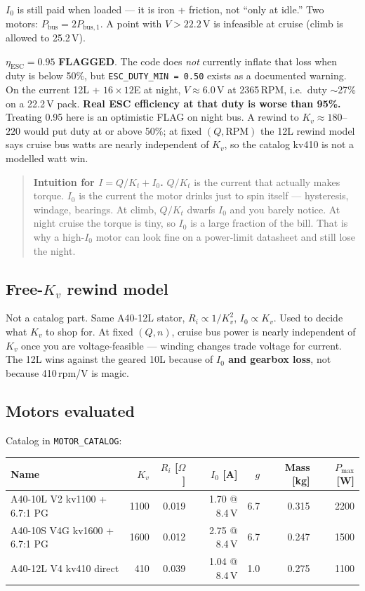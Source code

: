 \documentclass[11pt,letterpaper]{article}
\newcommand{\flag}{\textcolor{red!60!black}{\textbf{FLAGGED}}}
\newcommand{\code}[1]{\texttt{#1}}
\newenvironment{intuition}{\begin{quote}\small}{\end{quote}}
\begin{document}
$I_0$ is still paid when loaded --- it is iron + friction, not ``only at idle.'' Two motors: $P_\mathrm{bus} = 2 P_\mathrm{bus,1}$. A point with $V > 22.2\,\mathrm{V}$ is infeasible at cruise (climb is allowed to 25.2\,V).

$\eta_\mathrm{ESC} = 0.95$ \flag{}. The code does \emph{not} currently inflate that loss when duty is below 50\%, but \code{ESC\_DUTY\_MIN = 0.50} exists as a documented warning. On the current 12L + $16\times12$E at night, $V \approx 6.0\,\mathrm{V}$ at 2365\,RPM, i.e.\ duty $\sim$27\% on a 22.2\,V pack. \textbf{Real ESC efficiency at that duty is worse than 95\%.} Treating 0.95 here is an optimistic FLAG on night bus. A rewind to $K_v \approx 180$--$220$ would put duty at or above 50\%; at fixed $(Q,\mathrm{RPM})$ the 12L rewind model says cruise bus watts are nearly independent of $K_v$, so the catalog kv410 is not a modelled watt win.

\begin{intuition}
\textbf{Intuition for $I = Q/K_t + I_0$.} $Q/K_t$ is the current that actually makes torque. $I_0$ is the current the motor drinks just to spin itself --- hysteresis, windage, bearings. At climb, $Q/K_t$ dwarfs $I_0$ and you barely notice. At night cruise the torque is tiny, so $I_0$ is a large fraction of the bill. That is why a high-$I_0$ motor can look fine on a power-limit datasheet and still lose the night.
\end{intuition}

\subsection{Free-$K_v$ rewind model}

Not a catalog part. Same A40-12L stator, $R_i \propto 1/K_v^2$, $I_0 \propto K_v$. Used to decide what $K_v$ to shop for. At fixed $(Q, n)$, cruise bus power is nearly independent of $K_v$ once you are voltage-feasible --- winding changes trade voltage for current. The 12L wins against the geared 10L because of \textbf{$I_0$ and gearbox loss}, not because 410\,rpm/V is magic.

\subsection{Motors evaluated}
\label{sec:motors}

Catalog in \code{MOTOR\_CATALOG}:

\begin{center}
\begin{tabular}{@{}lrrrrrr@{}}
\toprule
Name & $K_v$ & $R_i$ [$\Omega$] & $I_0$ [A] & $g$ & Mass [kg] & $P_\max$ [W] \\
\midrule
A40-10L V2 kv1100 + 6.7:1 PG & 1100 & 0.019 & 1.70 @ 8.4\,V & 6.7 & 0.315 & 2200 \\
A40-10S V4G kv1600 + 6.7:1 PG & 1600 & 0.012 & 2.75 @ 8.4\,V & 6.7 & 0.247 & 1500 \\
A40-12L V4 kv410 direct & 410 & 0.039 & 1.04 @ 8.4\,V & 1.0 & 0.275 & 1100 \\
\bottomrule
\end{tabular}
\end{center}
\end{document}
